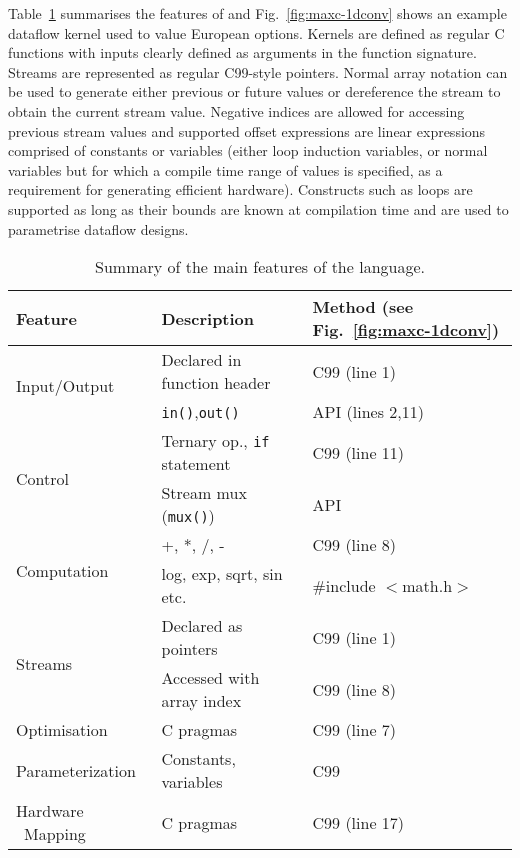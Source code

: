 Table~\ref{table:maxc-features} summarises the features of \FAST{} and
Fig.~\ref{fig:maxc-1dconv} shows an example dataflow kernel used to
value European options. Kernels are defined as regular C functions
with inputs clearly defined as arguments in the function
signature. Streams are represented as regular C99-style pointers.
Normal array notation can be used to generate either previous or
future values or dereference the stream to obtain the current stream
value. Negative indices are allowed for accessing previous stream
values and supported offset expressions are linear expressions
comprised of constants or variables (either loop induction variables,
or normal variables but for which a compile time range of values is
specified, as a requirement for generating efficient
hardware). Constructs such as loops are supported as long as their
bounds are known at compilation time and are used to parametrise
dataflow designs.

\begin{table}[!h]
  \centering
  \renewcommand{\arraystretch}{1.5}
  \caption{Summary of the main features of the \FAST{} language.}
  \label{table:maxc-features}
  \begin{tabularx}{\textwidth}{X|X|X}
    \hline
    \bf{Feature}                   & \bf{Description}                   & \bf{Method (see Fig.~\ref{fig:maxc-1dconv})} \\
    \hline\hline
    \multirow{2}{*}{Input/Output}         & Declared in function header          & C99 (line 1)                                 \\\cline{2-3}       & \texttt{in()},\texttt{out()}  & \FAST{} API (lines 2,11) \\
    \hline
    \multirow{2}{*}{Control}     & Ternary op., \texttt{if} statement & C99 (line 11)                                \\\cline{2-3}      & Stream mux (\texttt{mux()})       & \FAST{} API  \\
    \hline
    \multirow{2}{*}{Computation} & +, *, /, -                         & C99 (line 8)                           \\\cline{2-3} & log, exp, sqrt, sin etc.  & \#include $<$math.h$>$  \\
    \hline
    \multirow{2}{*}{Streams}     & Declared as pointers               & C99 (line 1)                                 \\\cline{2-3}       & Accessed with array index & C99 (line 8) \\
    \hline
    Optimisation                 & C pragmas                   & C99 (line 7)                                 \\
    \hline
    Parameterization             & Constants, variables                   & C99                                          \\
    \hline
    Hardware \  Mapping                  & C pragmas                   & C99 (line 17)                                \\
  \end{tabularx}
\end{table}

